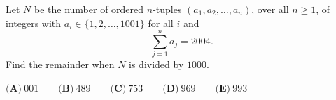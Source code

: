 Let $N$ be the number of ordered $n$-tuples $(a_1,a_2,\dots,a_n)$, over all $n\ge1$, of integers with $a_i\in\{1,2,\dots,1001\}$ for all $i$ and
\[\sum_{j=1}^{n}a_j=2004 .\]
Find the remainder when $N$ is divided by $1000$.

$\textbf{(A)}\ 001 \qquad\textbf{(B)}\ 489 \qquad\textbf{(C)}\ 753 \qquad\textbf{(D)}\ 969 \qquad\textbf{(E)}\ 993$
